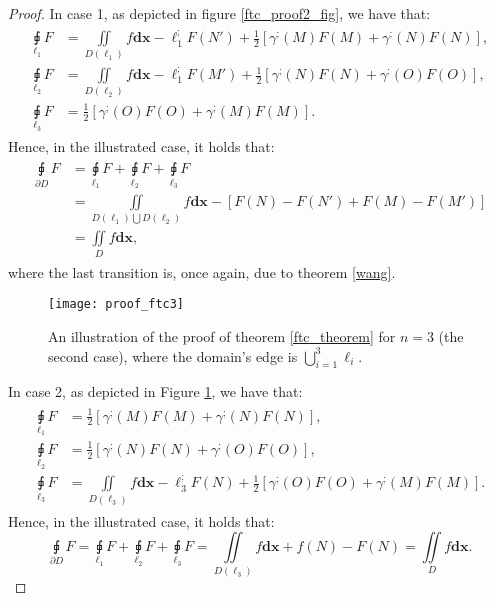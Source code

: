 \documentclass[11pt]{book}
\begin{document}
\begin{proof}
In case 1, as depicted in figure \ref{ftc_proof2_fig}, we have that:
\begin{align}
\begin{aligned}
\underset{\ell_{1}}{\sqint}F & =\underset{D\left(\ell_{1}\right)}{\iint}f\boldsymbol{dx}-\ell_{1}^{;}F\left(N'\right)+\frac{1}{2}\left[\gamma^{;}\left(M\right)F\left(M\right)+\gamma^{;}\left(N\right)F\left(N\right)\right],\\
\underset{\ell_{2}}{\sqint}F & =\underset{D\left(\ell_{2}\right)}{\iint}f\boldsymbol{dx}-\ell_{1}^{;}F\left(M'\right)+\frac{1}{2}\left[\gamma^{;}\left(N\right)F\left(N\right)+\gamma^{;}\left(O\right)F\left(O\right)\right],\\
\underset{\ell_{3}}{\sqint}F & =\frac{1}{2}\left[\gamma^{;}\left(O\right)F\left(O\right)+\gamma^{;}\left(M\right)F\left(M\right)\right].
\end{aligned}
\end{align}
Hence, in the illustrated case, it holds that:
\begin{align}
\begin{aligned}
\underset{\partial D}{\sqint}F & =\underset{\ell_{1}}{\sqint}F+\underset{\ell_{2}}{\sqint}F+\underset{\ell_{3}}{\sqint}F\\
 & =\underset{D\left(\ell_{1}\right)\bigcup D\left(\ell_{2}\right)}{\iint}f\boldsymbol{dx}-\left[F\left(N\right)-F\left(N'\right)+F\left(M\right)-F\left(M'\right)\right]\\
 & =\underset{D}{\iint}f\boldsymbol{dx},
\end{aligned}
\end{align}
where the last transition is, once again, due to theorem \ref{wang}.

\begin{figure}
\texttt{[image: proof\_ftc3]}
\caption{An illustration of the proof of theorem \ref{ftc_theorem} for $n=3$ (the second case), where the domain’s edge is $\bigcup_{i=1}^{3}\ell_{i}$.}
\label{ftc_proof3_fig}
\end{figure}

In case 2, as depicted in Figure \ref{ftc_proof3_fig}, we have that:
\begin{align}
\begin{aligned}
\underset{\ell_{1}}{\sqint}F & =\frac{1}{2}\left[\gamma^{;}\left(M\right)F\left(M\right)+\gamma^{;}\left(N\right)F\left(N\right)\right],\\
\underset{\ell_{2}}{\sqint}F & =\frac{1}{2}\left[\gamma^{;}\left(N\right)F\left(N\right)+\gamma^{;}\left(O\right)F\left(O\right)\right],\\
\underset{\ell_{3}}{\sqint}F & =\underset{D\left(\ell_{3}\right)}{\iint}f\boldsymbol{dx}-\ell_{3}^{;}F\left(N\right)+\frac{1}{2}\left[\gamma^{;}\left(O\right)F\left(O\right)+\gamma^{;}\left(M\right)F\left(M\right)\right].
\end{aligned}
\end{align}
Hence, in the illustrated case, it holds that:
\[
\underset{\partial D}{\sqint}F=\underset{\ell_{1}}{\sqint}F+\underset{\ell_{2}}{\sqint}F+\underset{\ell_{3}}{\sqint}F=\underset{D\left(\ell_{3}\right)}{\iint}f\boldsymbol{dx}+f\left(N\right)-F\left(N\right)=\underset{D}{\iint}f\boldsymbol{dx}.
\]


\end{proof}
\end{document}
